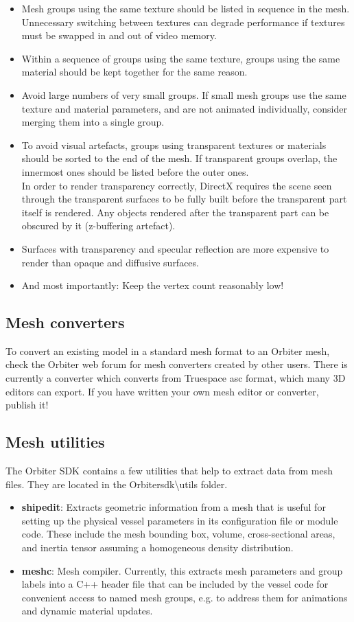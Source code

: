 \documentclass[Orbiter Developer Manual.tex]{subfiles}
\begin{document}
\begin{itemize}
\item Mesh groups using the same texture should be listed in sequence in the mesh. Unnecessary switching between textures can degrade performance if textures must be swapped in and out of video memory.
\item Within a sequence of groups using the same texture, groups using the same material should be kept together for the same reason.
\item Avoid large numbers of very small groups. If small mesh groups use the same texture and material parameters, and are not animated individually, consider merging them into a single group.
\item To avoid visual artefacts, groups using transparent textures or materials should be sorted to the end of the mesh. If transparent groups overlap, the innermost ones should be listed before the outer ones.\\
In order to render transparency correctly, DirectX requires the scene seen through the transparent surfaces to be fully built before the transparent part itself is rendered. Any objects rendered after the transparent part can be obscured by it (z-buffering artefact).
\item Surfaces with transparency and specular reflection are more expensive to render than opaque and diffusive surfaces.
\item And most importantly: Keep the vertex count reasonably low!
\end{itemize}


\subsection{Mesh converters}
To convert an existing model in a standard mesh format to an Orbiter mesh, check the Orbiter web forum for mesh converters created by other users. There is currently a converter which converts from Truespace asc format, which many 3D editors can export. If you have written your own mesh editor or converter, publish it!


\subsection{Mesh utilities}
The Orbiter SDK contains a few utilities that help to extract data from mesh files. They are located in the Orbitersdk\textbackslash utils folder.

\begin{itemize}
\item \textbf{shipedit}: Extracts geometric information from a mesh that is useful for setting up the physical vessel parameters in its configuration file or module code. These include the mesh bounding box, volume, cross-sectional areas, and inertia tensor assuming a homogeneous density distribution.
\item \textbf{meshc}: Mesh compiler. Currently, this extracts mesh parameters and group labels into a C++ header file that can be included by the vessel code for convenient access to named mesh groups, e.g. to address them for animations and dynamic material updates.
\end{itemize}
\end{document}
